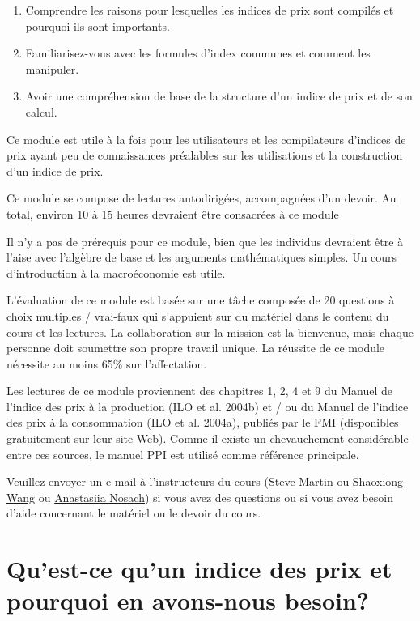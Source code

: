 \documentclass[
]{article}
\begin{document}
\begin{enumerate}
\def\labelenumi{\arabic{enumi}.}
\item
  Comprendre les raisons pour lesquelles les indices de prix sont compilés et pourquoi ils sont importants.
\item
  Familiarisez-vous avec les formules d'index communes et comment les manipuler.
\item
  Avoir une compréhension de base de la structure d'un indice de prix et de son calcul.
\end{enumerate}

Ce module est utile à la fois pour les utilisateurs et les compilateurs d'indices de prix ayant peu de connaissances préalables sur les utilisations et la construction d'un indice de prix.

Ce module se compose de lectures autodirigées, accompagnées d'un devoir. Au total, environ 10 à 15 heures devraient être consacrées à ce module

Il n'y a pas de prérequis pour ce module, bien que les individus devraient être à l'aise avec l'algèbre de base et les arguments mathématiques simples. Un cours d'introduction à la macroéconomie est utile.

L'évaluation de ce module est basée sur une tâche composée de 20 questions à choix multiples / vrai-faux qui s'appuient sur du matériel dans le contenu du cours et les lectures. La collaboration sur la mission est la bienvenue, mais chaque personne doit soumettre son propre travail unique. La réussite de ce module nécessite au moins 65\% sur l'affectation.

Les lectures de ce module proviennent des chapitres 1, 2, 4 et 9 du Manuel de l'indice des prix à la production (ILO et al. 2004b) et / ou du Manuel de l'indice des prix à la consommation (ILO et al. 2004a), publiés par le FMI (disponibles gratuitement sur leur site Web). Comme il existe un chevauchement considérable entre ces sources, le manuel PPI est utilisé comme référence principale.

Veuillez envoyer un e-mail à l'instructeurs du cours (\href{mailto:steve.martin5@canada.ca}{Steve Martin} ou \href{mailto:shaoxiong.wang@canada.ca}{Shaoxiong Wang} ou \href{mailto:anastasiia.nosach@canada.ca}{Anastasiia Nosach}) si vous avez des questions ou si vous avez besoin d'aide concernant le matériel ou le devoir du cours.

\hypertarget{quest-ce-quun-indice-des-prix-et-pourquoi-en-avons-nous-besoin}{%
\section{Qu'est-ce qu'un indice des prix et pourquoi en avons-nous besoin?}\label{quest-ce-quun-indice-des-prix-et-pourquoi-en-avons-nous-besoin}}
\end{document}
